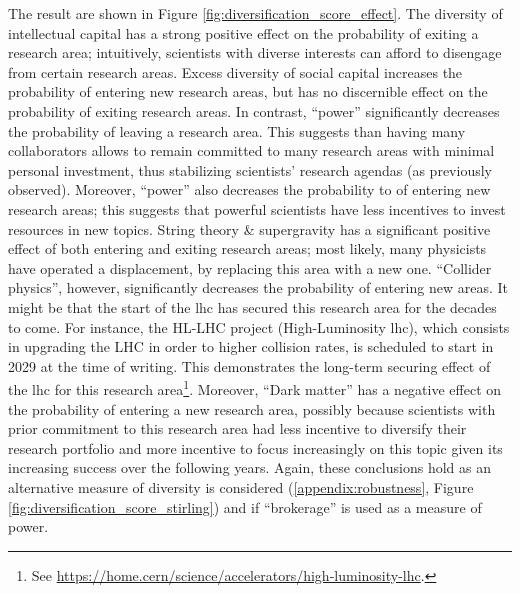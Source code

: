 \documentclass{article}
\begin{document}
The result are shown in Figure \ref{fig:diversification_score_effect}. The diversity of intellectual capital has a strong positive effect on the probability of exiting a research area; intuitively, scientists with diverse interests can afford to disengage from certain research areas. Excess diversity of social capital increases the probability of entering new research areas, but has no discernible effect on the probability of exiting research areas. In contrast, ``power'' significantly decreases the probability of leaving a research area. This suggests than having many collaborators allows to remain committed to many research areas with minimal personal investment, thus stabilizing scientists' research agendas (as previously observed). Moreover, ``power'' also decreases the probability to of entering new research areas; this suggests that powerful scientists have less incentives to invest resources in new topics. String theory \& supergravity has a significant positive effect of both entering and exiting research areas; most likely, many physicists have operated a displacement, by replacing this area with a new one. ``Collider physics'', however, significantly decreases the probability of entering new areas. It might be that the start of the \gls{lhc} has secured this research area for the decades to come. %
For instance, the HL-LHC project (High-Luminosity \gls{lhc}), which consists in upgrading the LHC in order to higher collision rates, is scheduled to start in 2029 at the time of writing. This demonstrates the long-term securing effect of the \gls{lhc} for this research area\footnote{See \url{https://home.cern/science/accelerators/high-luminosity-lhc}.}. Moreover, ``Dark matter'' has a negative effect on the probability of entering a new research area, possibly because scientists with prior commitment to this research area had less incentive to diversify their research portfolio and more incentive to focus increasingly on this topic given its increasing success over the following years. Again, these conclusions hold as an alternative measure of diversity is considered (\ref{appendix:robustness}, Figure \ref{fig:diversification_score_stirling}) and if ``brokerage'' is used as a measure of power.
 
\end{document}
